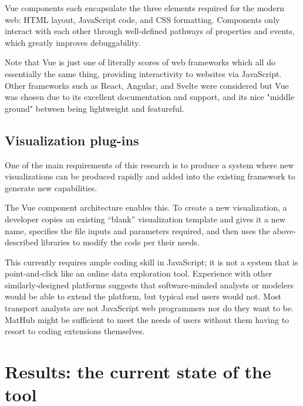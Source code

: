 Vue components each encapsulate the three elements required for the modern web: HTML layout, JavaScript code, and CSS formatting. Components only interact with each other through well-defined pathways of properties and events, which greatly improves debuggability.

Note that Vue is just one of literally scores of web frameworks which all do essentially the same thing, providing interactivity to websites via JavaScript. Other frameworks such as React, Angular, and Svelte were considered but Vue was chosen due to its excellent documentation and support, and its nice "middle ground" between being lightweight and featureful.

\hypertarget{mathub-visualization-plug-ins}{%
\subsection{Visualization plug-ins}\label{visualization-plug-ins}}

One of the main requirements of this research is to produce a system where new visualizations can be produced rapidly and added into the existing framework to generate new capabilities.

The Vue component architecture enables this. To create a new visualization, a developer copies an existing ``blank'' visualization template and gives it a new name, specifies the file inputs and parameters required, and then uses the above-described libraries to modify the code per their needs.

This currently requires ample coding skill in JavaScript; it is not a system that is point-and-click like an online data exploration tool. Experience with other similarly-designed platforms suggests that software-minded analysts or modelers would be able to extend the platform, but typical end users would not. Most transport analysts are not JavaScript web programmers nor do they want to be. MatHub might be sufficient to meet the needs of users without them having to resort to coding extensions themselves.

\hypertarget{mathub-results-the-current-state-of-the-tool}{%
\section{Results: the current state of the tool}\label{results-the-current-state-of-the-tool}}

